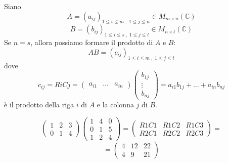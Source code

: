 \documentclass[a4paper]{article}
\theoremstyle{break}
\theoremstyle{break}
\theoremstyle{break}
\theoremstyle{break}
\begin{document}
\begin{itemize}
Siano \[ A = (a_{ij})_{1 \le i \le m\;,\;1 \le j \le n} \in M_{m \times n}(\mathbb{C}) \]
\[ B = (b_{ij})_{1 \le i \le s\;,\;1 \le j \le t} \in M_{n \times t}(\mathbb{C}) \]
Se \( n=s \), allora possiamo formare il prodotto di \( A \) e \( B \):
\[
  AB = (c_{ij})_{1 \le i \le m\;,\;1 \le j \le t}
\] 
dove
\[
  c_{ij} = RiCj = \begin{pmatrix} a_{i1} & \ldots & a_{in} \end{pmatrix} 
  \begin{pmatrix} b_{1j} \\ \vdots \\ b_{nj} \end{pmatrix} = a_{i1}b_{1j} + \ldots + a_{in}b_{nj}
\] 
è il prodotto della riga \( i \) di \( A \) e la colonna \( j \) di \( B \).

\begin{example}
  \[
    \begin{pmatrix} 1 & 2 & 3\\
    0 & 1 & 4\end{pmatrix} 
      \begin{pmatrix} 1 & 4 & 0\\
        0 & 1 & 5\\
      1 & 2 & 4\end{pmatrix} 
      =
        \begin{pmatrix} R1C1 & R1C2 & R1C3\\
        R2C1 & R2C2 & R2C3\end{pmatrix} =
        \] 
        \[
          =
          \begin{pmatrix} 
            4 & 12 & 22\\
            4 & 9 & 21
          \end{pmatrix}
        \] 
      \end{example}
  \end{itemize}
\end{document}
